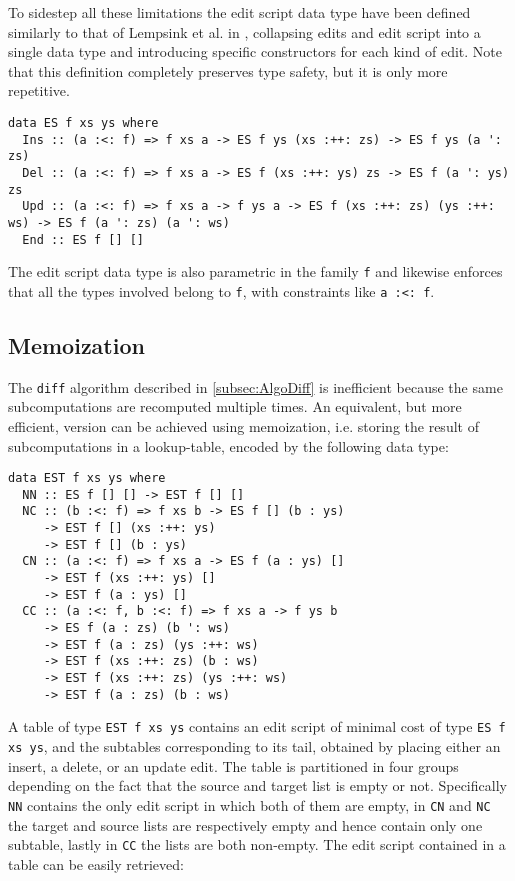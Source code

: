 \documentclass[../Thesis.tex]{subfiles}
\begin{document}
	To sidestep all these limitations the edit script data type have been defined 
	similarly to that of Lempsink et al. in \cite{Lemp09}, 
	collapsing edits and edit script into
	a single data type and introducing specific constructors for
	each kind of edit. Note that this definition completely preserves type safety,
	but it is only more repetitive.

\begin{verbatim}
data ES f xs ys where
  Ins :: (a :<: f) => f xs a -> ES f ys (xs :++: zs) -> ES f ys (a ': zs)
  Del :: (a :<: f) => f xs a -> ES f (xs :++: ys) zs -> ES f (a ': ys) zs
  Upd :: (a :<: f) => f xs a -> f ys a -> ES f (xs :++: zs) (ys :++: ws) -> ES f (a ': zs) (a ': ws)
  End :: ES f [] []
\end{verbatim}

	The edit script data type is also parametric in the family \texttt{f} 
	and likewise enforces that all the types involved belong to \texttt{f},
	with constraints like \texttt{a :<: f}. 

	\subsection{Memoization}
	The \texttt{diff} algorithm described in \ref{subsec:AlgoDiff} is inefficient 
	because the same subcomputations are recomputed multiple times.
	An equivalent, but more efficient, version can be achieved using 
	memoization, i.e. storing the result of subcomputations in a lookup-table,
	encoded by the following data type:
	
\begin{verbatim}	
data EST f xs ys where
  NN :: ES f [] [] -> EST f [] []
  NC :: (b :<: f) => f xs b -> ES f [] (b : ys) 
     -> EST f [] (xs :++: ys) 
     -> EST f [] (b : ys)
  CN :: (a :<: f) => f xs a -> ES f (a : ys) [] 
     -> EST f (xs :++: ys) []
     -> EST f (a : ys) []
  CC :: (a :<: f, b :<: f) => f xs a -> f ys b 
     -> ES f (a : zs) (b ': ws) 
     -> EST f (a : zs) (ys :++: ws)
     -> EST f (xs :++: zs) (b : ws)
     -> EST f (xs :++: zs) (ys :++: ws)
     -> EST f (a : zs) (b : ws)
\end{verbatim}
	
	A table of type \texttt{EST f xs ys} contains an edit script
	of minimal cost of type \texttt{ES f xs ys}, and the subtables
	corresponding to its tail, obtained by placing either an insert,
	a delete, or an update edit.
	The table is partitioned in four groups depending on the fact
	that the source and target list is empty or not.
	Specifically \texttt{NN} contains the only edit script in which both
	of them are empty, in \texttt{CN} and \texttt{NC} the target and source
	lists are respectively empty and hence contain only one subtable,
	lastly in \texttt{CC} the lists are both non-empty.
	The edit script contained in a table can be easily retrieved:
	
\end{document}
